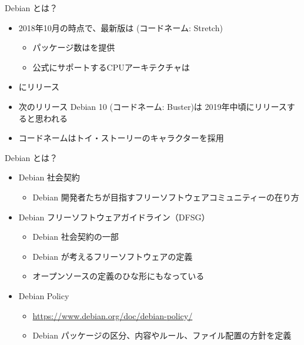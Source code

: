\begin{frame}{Debian とは？}

\begin{itemize}
  \item 2018年10月の時点で、最新版は {\color{red}{Debian 9.5}} (コードネーム: Stretch)
  \begin{itemize}
    \item パッケージ数は{\color{red}{約51000}}を提供
    \item 公式にサポートするCPUアーキテクチャは{\color{red}{10}}
  \end{itemize}
  \item {\color{red}{約2年毎}}にリリース
  \item 次のリリース Debian 10 (コードネーム: {\color{red}{}}Buster)は 2019年中頃にリリースすると思われる
  \item コードネームはトイ・ストーリーのキャラクターを採用
\end{itemize}

\end{frame}


\begin{frame}{Debian とは？}

\begin{itemize}
  \item Debian 社会契約
    \begin{itemize}
      \item Debian 開発者たちが目指すフリーソフトウェアコミュニティーの在り方
    \end{itemize}
  \item Debian フリーソフトウェアガイドライン（DFSG）
    \begin{itemize}
      \item Debian 社会契約の一部
      \item Debian が考えるフリーソフトウェアの定義
      \item オープンソースの定義のひな形にもなっている
    \end{itemize}
  \item Debian Policy
    \begin{itemize}
      \item \url{https://www.debian.org/doc/debian-policy/}
      \item Debian パッケージの区分、内容やルール、ファイル配置の方針を定義
    \end{itemize}
\end{itemize}

\end{frame}


